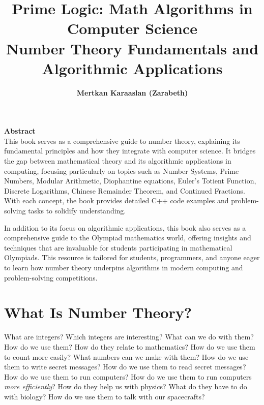 \documentclass[10pt,a4paper]{article}
\title{\Huge \textbf{Prime Logic: Math Algorithms in Computer Science}\\[0.5cm]
\Large Number Theory Fundamentals and Algorithmic Applications}
\author{\textbf{Mertkan Karaaslan (Zarabeth)}}
\date{}
\begin{document}
\maketitle


\vspace{2cm}

\vfill

\begin{center}
    \textbf{Abstract}\\[0.5cm]
    This book serves as a comprehensive guide to number theory, explaining its fundamental principles and how they integrate with computer science. It bridges the gap between mathematical theory and its algorithmic applications in computing, focusing particularly on topics such as Number Systems, Prime Numbers, Modular Arithmetic, Diophantine equations, Euler’s Totient Function, Discrete Logarithms, Chinese Remainder Theorem, and Continued Fractions. With each concept, the book provides detailed C++ code examples and problem-solving tasks to solidify understanding.
    
    In addition to its focus on algorithmic applications, this book also serves as a comprehensive guide to the Olympiad mathematics world, offering insights and techniques that are invaluable for students participating in mathematical Olympiads. This resource is tailored for students, programmers, and anyone eager to learn how number theory underpins algorithms in modern computing and problem-solving competitions.
\end{center}

\vfill

\newpage

\newpage
\pagestyle{fancy}

\section*{What Is Number Theory?}

What are integers? Which integers are interesting? What can we do with them? How do we use them? How do they relate to mathematics? How do we use them to count more easily? What numbers can we make with them? How do we use them to write secret messages? How do we use them to read secret messages? How do we use them to run computers? How do we use them to run computers \textit{more efficiently}? How do they help us with physics? What do they have to do with biology? How do we use them to talk with our spacecrafts?
\end{document}
